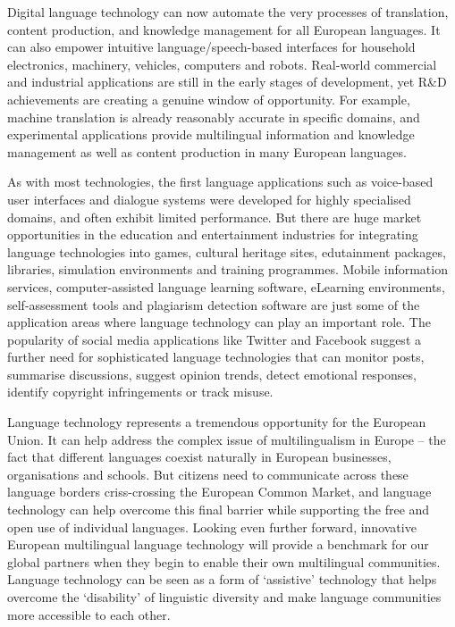 \documentclass[]{../../metanetpaper}
\begin{document}
\begin{multicols}{2}
Digital language technology can now automate the very processes of translation,
content production, and knowledge management for all European languages. It can
also empower intuitive language/speech-based interfaces for household
electronics, machinery, vehicles, computers and robots. Real-world commercial
and industrial applications are still in the early stages of development, yet R\&D
achievements are creating a genuine window of opportunity. For example,
machine translation is already reasonably accurate in specific domains, and
experimental applications provide multilingual information and knowledge
management as well as content production in many European languages.

As with most technologies, the first language applications such as voice-based
user interfaces and dialogue systems were developed for highly specialised
domains, and often exhibit limited performance. But there are huge market
opportunities in the education and entertainment industries for integrating
language technologies into games, cultural heritage sites, edutainment
packages, libraries, simulation environments and training programmes. Mobile
information services, computer-assisted language learning software, eLearning
environments, self-assessment tools and plagiarism detection software are just
some of the application areas where language technology can play an important
role. The popularity of social media applications like Twitter and Facebook
suggest a further need for sophisticated language technologies that can monitor
posts, summarise discussions, suggest opinion trends, detect emotional
responses, identify copyright infringements or track misuse.


Language technology represents a tremendous opportunity for the European Union.
It can help address the complex issue of multilingualism in Europe – the fact
that different languages coexist naturally in European businesses,
organisations and schools. But citizens need to communicate across these
language borders criss-crossing the European Common Market, and language
technology can help overcome this final barrier while supporting the free and
open use of individual languages. Looking even further forward, innovative
European multilingual language technology will provide a benchmark for our
global partners when they begin to enable their own multilingual communities.
Language technology can be seen as a form of ‘assistive’ technology that helps
overcome the ‘disability’ of linguistic diversity and make language communities
more accessible to each other.


\end{multicols}
\end{document}
